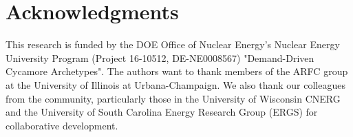 \section{Acknowledgments}
This research is funded by the \gls{DOE} Office of 
Nuclear Energy's Nuclear Energy University Program 
(Project 16-10512, DE-NE0008567) 
"Demand-Driven Cycamore Archetypes". The authors want to thank 
members of the \gls{ARFC} group at the University of Illinois at 
Urbana-Champaign. 
We also thank our colleagues from the \Cyclus community, 
particularly those in the University of Wisconsin 
\gls{CNERG} and the University of South Carolina Energy Research 
Group (ERGS) for collaborative \Cyclus development.